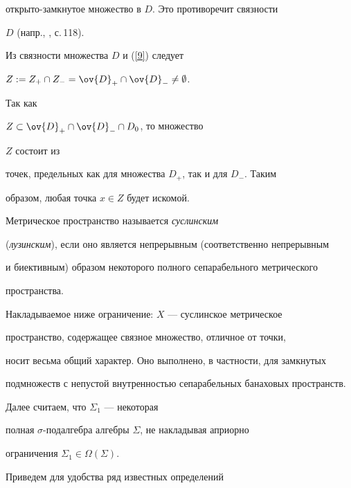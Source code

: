 \begin{pf}
от\-кры\-то-зам\-кну\-тое множество в $D$. Это противоречит связности


$D$ (напр., \cite{31}, с.\,118).





Из связности множества $D$ и (\ref{9}) следует


$Z:= Z_+\cap Z_-=\ov{D}_+\cap\ov{D}_-\ne\emptyset$.


Так как


$Z\subset\ov{D}_+\cap\ov{D}_-\cap D_0$, то множество


$Z$ состоит из


точек, предельных как для множества $D_+$, так и для $D_-$. Таким


образом, любая точка $x\in Z$ будет искомой.


\end{pf}





\begin{defn}


Метрическое пространство называется {\it суслинским}


({\it лузинским}), если оно является непрерывным (соответственно непрерывным


и биективным) образом некоторого полного сепарабельного метрического


пространства.


\end{defn}





Накладываемое ниже ограничение: $X$ --- суслинское метрическое


пространство, содержащее связное множество, отличное от точки,


носит весьма общий характер. Оно выполнено, в частности, для замкнутых


подмножеств с непустой внутренностью сепарабельных банаховых пространств.





Далее считаем, что $\Sigma_1$ --- некоторая


полная $\sigma$-по\-дал\-геб\-ра алгебры $\Sigma$, не накладывая априорно


ограничения $\Sigma_1\in{\Omega}(\Sigma)$.





Приведем для удобства ряд известных определений


